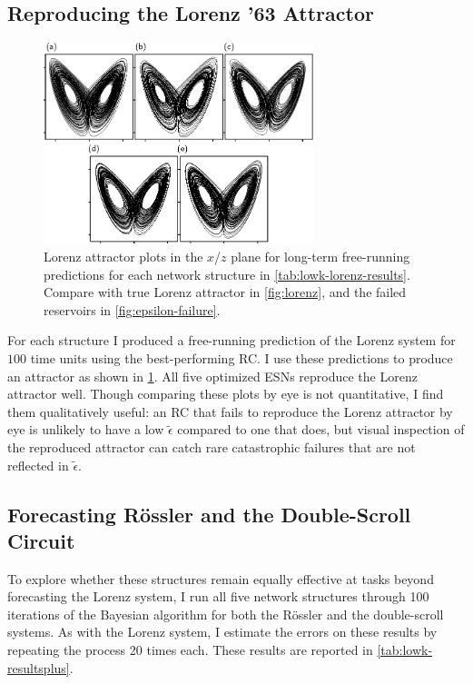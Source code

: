 \subsection{Reproducing the Lorenz '63 Attractor}

\begin{figure}
  \includegraphics[width=0.7\textwidth]{figures/lowk-attractors}
  \caption{Lorenz attractor plots in the $x$/$z$ plane for long-term
    free-running predictions for each network structure in
    \cref{tab:lowk-lorenz-results}. Compare with true Lorenz attractor
    in \cref{fig:lorenz}, and the failed reservoirs in
    \cref{fig:epsilon-failure}.}%
  \label{fig:lowk-attractors}
\end{figure}

For each structure I produced a free-running prediction of
the Lorenz system for $100$ time units using the best-performing RC.\@
I use these predictions to produce an attractor as shown in
\cref{fig:lowk-attractors}. All five optimized ESNs reproduce the
Lorenz attractor well. Though comparing these plots by eye is not
quantitative, I find them qualitatively useful: an RC that fails to
reproduce the Lorenz attractor by eye is unlikely to have a low
$\tilde{\epsilon}$ compared to one that does, but visual inspection of
the reproduced attractor can catch rare catastrophic failures that are
not reflected in $\tilde{\epsilon}$.

\subsection{Forecasting R{\"{o}}ssler and the Double-Scroll Circuit}

To explore whether these structures remain equally effective at tasks
beyond forecasting the Lorenz system, I run all five network
structures through 100 iterations of the Bayesian algorithm for both
the R{\"{o}}ssler and the double-scroll systems. As with the Lorenz
system, I estimate the errors on these results by repeating the
process 20 times each. These results are reported in
\cref{tab:lowk-resultsplus}.

